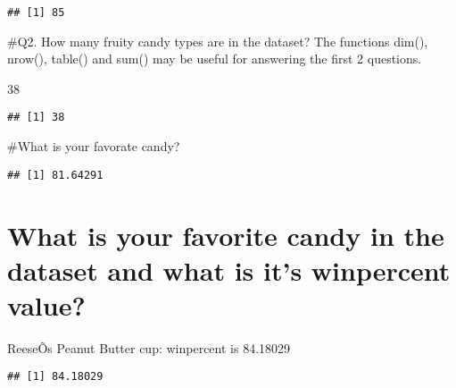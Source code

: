 \documentclass[
]{article}
\newenvironment{Shaded}{\begin{snugshade}}{\end{snugshade}}
\newcommand{\DecValTok}[1]{\textcolor[rgb]{0.00,0.00,0.81}{#1}}
\newcommand{\KeywordTok}[1]{\textcolor[rgb]{0.13,0.29,0.53}{\textbf{#1}}}
\newcommand{\NormalTok}[1]{#1}
\newcommand{\OperatorTok}[1]{\textcolor[rgb]{0.81,0.36,0.00}{\textbf{#1}}}
\newcommand{\StringTok}[1]{\textcolor[rgb]{0.31,0.60,0.02}{#1}}
\begin{document}
\begin{verbatim}
## [1] 85
\end{verbatim}

\#Q2. How many fruity candy types are in the dataset? The functions
dim(), nrow(), table() and sum() may be useful for answering the first 2
questions.

38

\begin{Shaded}
\end{Shaded}

\begin{verbatim}
## [1] 38
\end{verbatim}

\#What is your favorate candy?

\begin{Shaded}
\end{Shaded}

\begin{verbatim}
## [1] 81.64291
\end{verbatim}

\hypertarget{what-is-your-favorite-candy-in-the-dataset-and-what-is-its-winpercent-value}{%
\section{What is your favorite candy in the dataset and what is it's
winpercent
value?}\label{what-is-your-favorite-candy-in-the-dataset-and-what-is-its-winpercent-value}}

ReeseÕs Peanut Butter cup: winpercent is 84.18029

\begin{Shaded}
\end{Shaded}

\begin{verbatim}
## [1] 84.18029
\end{verbatim}
\end{document}
